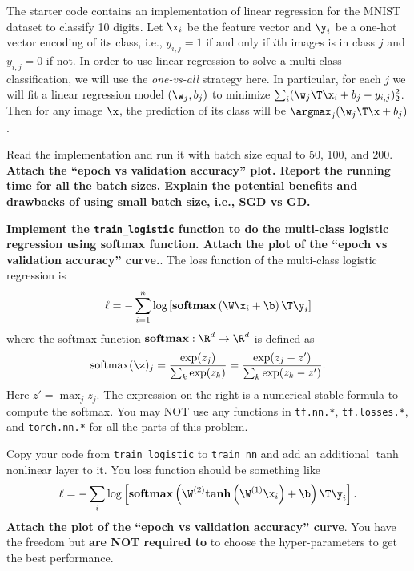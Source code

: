 \documentclass[preview]{standalone}
\begin{document}
\begin{Parts}

\Part The starter code contains an implementation of linear regression for the
MNIST dataset to classify 10 digits.  Let $\x_i$ be the feature vector and
$\y_i$ be a one-hot vector encoding of its class, i.e., $y_{i,j}=1$ if and only
if $i$th images is in class $j$ and $y_{i,j}=0$ if not.  In order to use linear
regression to solve a multi-class classification, we will use the
\emph{one-vs-all} strategy here.  In particular, for each $j$ we will fit a
linear regression model $(\w_j, b_j)$ to minimize $\sum_i (\w_j \T \x_i + b_j -
y_{i,j})_2^2$.  Then for any image $\x$, the prediction of its class will be
$\argmax_j (\w_j\T \x + b_j)$.

Read the implementation and run it with batch size equal to 50, 100, and 200.
\textbf{Attach the ``epoch vs validation accuracy'' plot.  Report the running
time for all the batch sizes.  Explain the potential benefits and drawbacks of
using small batch size, i.e., SGD vs GD.}



\Part \textbf{Implement the \texttt{train\_logistic} function to do the
multi-class logistic regression using softmax function.  Attach the plot of the
``epoch vs validation accuracy'' curve.}.  The loss function of the multi-class
logistic regression is
\begin{equation}
    \ell = -\sum_{i=1}^n \log\left[\mathbf{softmax}\left(\W \x_i + \b\right)\T \y_i\right]
\end{equation}
where the softmax function $\mathbf{softmax}:\R^d \to \R^d$ is defined as
\begin{equation}
    \mathrm{softmax}(\z)_j
    =\frac{\exp(z_j)}{\sum_k \exp(z_k)}
    =\frac{\exp(z_j-z')}{\sum_k \exp(z_k-z')}.
\end{equation}
Here $z'=\max_j z_j$.  The expression on the right is a numerical stable
formula to compute the softmax.  You may NOT use any functions in
\texttt{tf.nn.*}, \texttt{tf.losses.*}, and \texttt{torch.nn.*} for all the
parts of this problem.



\Part Copy your code from \texttt{train\_logistic} to \texttt{train\_nn} and
add an additional $\tanh$ nonlinear layer to it.  You loss function should be
something like
\begin{equation}
    \ell = -\sum_i \log\left[\mathbf{softmax}\left(\W^{(2)} \textbf{tanh}\left(\W^{(1)}\x_i\right) + \b\right)\T \y_i\right].
\end{equation}
\textbf{Attach the plot of the ``epoch vs validation accuracy'' curve}.  You
have the freedom but \textbf{are NOT required to} to choose the hyper-parameters
to get the best performance.


\end{Parts}
\end{document}
